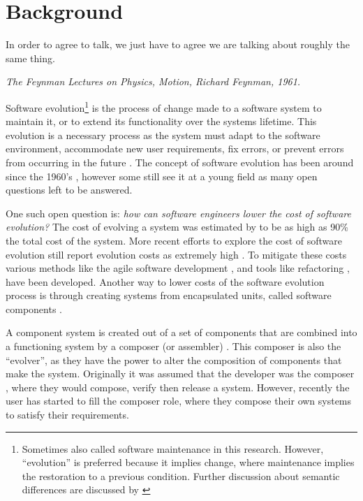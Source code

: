 \chapter{Background}
\label{background}
\epigraph{
In order to agree to talk, we just have to agree we are talking about roughly the same thing.
}
{\textit{The Feynman Lectures on Physics, Motion, Richard Feynman, 1961.}}

Software evolution\footnote{Sometimes also called software maintenance in this research. 
However, ``evolution'' is preferred because it implies change, where maintenance implies the restoration to a previous condition. 
Further discussion about semantic differences are discussed by \cite{Godfrey2008}} 
 \citep{lehman1980} is the process of change made to a software system to maintain it, or to extend its functionality over the systems lifetime.
This evolution is a necessary process as the system must adapt to the software environment, accommodate new user requirements, 
fix errors, or prevent errors from occurring in the future \citep{IsoIec2006}.
The concept of software evolution has been around since the 1960's \citep{Lehman1969}, 
however some still see it at a young field \citep{Godfrey2008} as many open questions left to be answered.

One such open question is: \textit{how can software engineers lower the cost of software evolution?}
The cost of evolving a system was estimated by \cite{Brooks1975} to be as high as 90\% the total cost of the system.
More recent efforts to explore the cost of software evolution still report evolution costs as extremely high \citep{Grubb2003}.
To mitigate these costs various methods like the agile software development \citep{beck2001manifesto},
and tools like refactoring \citep{fowler1999refactoring}, have been developed. 
Another way to lower costs of the software evolution process is through creating systems from encapsulated units, called software components \citep{Szyperski2002}.

A component system is created out of a set of components that are combined into a functioning system by a composer (or assembler) \citep{Szyperski2002}.
This composer is also the ``evolver'', as they have the power to alter the composition of components that make the system.
Originally it was assumed that the developer was the composer \citep{Parnas1972,PrietoDiaz1987}, where they would compose, verify then release a system.
However, recently the user has started to fill the composer role, where they compose their own systems to satisfy their requirements.

